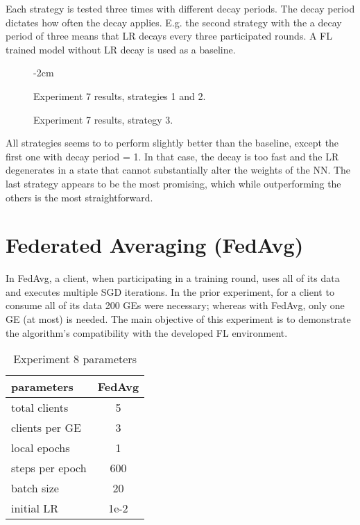 Each strategy is tested three times with different decay periods. The decay period dictates how often the decay applies. E.g. the second strategy with the a decay period of three means that LR decays every three participated rounds. A FL trained model without LR decay is used as a baseline.
\medskip\medskip
\begin{figure}[H]
    \center
    \addtolength{\leftskip} {-2cm}
    \addtolength{\rightskip}{-2cm}
    
    \caption[Experiment 7 results]{Experiment 7 results, strategies 1 and 2.}
\end{figure}%
\begin{figure}[H]\ContinuedFloat
    \center
    
    \caption[Experiment 7 results]{Experiment 7 results, strategy 3.}
    \label{fig:Experiment 7 results}
\end{figure}

All strategies seems to to perform slightly better than the baseline, except the first one with decay period = 1. In that case, the decay is too fast and the LR degenerates in a state that cannot substantially alter the weights of the NN. The last strategy appears to be the most promising, which while outperforming the others is the most straightforward.

\section{Federated Averaging (FedAvg)}
In FedAvg, a client, when participating in a training round, uses all of its data and executes multiple SGD iterations. In the prior experiment, for a client to consume all of its data 200 GEs were necessary; whereas with FedAvg, only one GE (at most) is needed. The main objective of this experiment is to demonstrate the algorithm's compatibility with the developed FL environment.

\begin{table}[H]
    \center
    \begin{tabular}
        { | l | c | }
        \hline
        parameters & FedAvg\\\hline
        total clients   & 5\\\hline
        clients per GE  & 3\\\hline
        local epochs    & 1\\\hline
        steps per epoch & 600\\\hline
        batch size      & 20\\\hline
        initial LR      &  1e-2\\\hline
    \end{tabular}
    \caption[Experiment 8 parameters]{Experiment 8 parameters}
    \label{table:Experiment 8 parameters}
\end{table}

